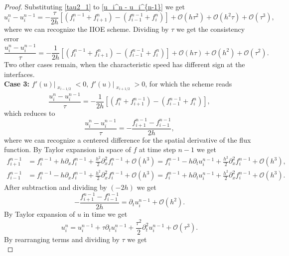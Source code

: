 \documentclass[../include.tex]{subfiles}
\begin{document}
\begin{proof}
Substituting \eqref{tau2_1} to \eqref{u_i^n - u_i^{n-1}} we get
\[	u_i^n - u_i^{n-1} = - \frac{\tau}{2h}\left[(f_i^{n-1} + f_{i+1}^{n}) - (f_{i-1}^{n-1} + f_i^{n})\right] + \mathcal{O}(h\tau^2) + \mathcal{O}(h^2\tau) + \mathcal{O}(\tau^3),\]
where we can recognize the IIOE scheme. Dividing by $ \tau $ we get the consistency error
\begin{equation}
	\frac{u_i^n - u_i^{n-1}}{\tau} = - \frac{1}{2h}\left[(f_i^{n-1} + f_{i+1}^{n}) - (f_{i-1}^{n-1} + f_i^{n})\right] + \mathcal{O}(h\tau) + \mathcal{O}(h^2) + \mathcal{O}(\tau^2).
\end{equation}
Two other cases remain, when the characteristic speed has different sign at the interfaces.\\
\textbf{Case 3: } $ f'(u)\big|_{\substack{x_{i-1/2}}} < 0,  \,f'(u)\big|_{\substack{x_{i+1/2}}} > 0 $, for which the scheme reads
\[
\frac{u_i^{n} - u_i^{n - 1}}{\tau} = - \frac{1}{2h}\left[(f_i^{n} + f_{i+1}^{n-1}) - (f_{i-1}^{n-1} + f_i^{n})\right],
\]
which reduces to
\begin{equation}
	\label{Taylor_exp}
	\frac{u_i^{n} - u_i^{n - 1}}{\tau} = - \frac{f_{i+1}^{n-1} - f_{i-1}^{n-1}}{2h},
\end{equation}
where we can recognize a centered difference for the spatial derivative of the flux function. By Taylor expansion in space of $ f $ at time step $ n-1 $ we get
\begin{align}
	f_{i+1}^{n-1} &= f_i^{n-1} + h \partial_x f_i^{n-1} + \frac{h^2}{2} \partial_x^2 f_i^{n-1} + \mathcal{O}(h^3) = 
	f_i^{n-1} - h \partial_t u_i^{n-1} + \frac{h^2}{2} \partial_x^2 f_i^{n-1} + \mathcal{O}(h^3),\nonumber\\
	f_{i-1}^{n-1} &= f_i^{n-1} - h\partial_x f_i^{n-1} + \frac{h^2}{2}\partial_x^2 f_i^{n-1} + \mathcal{O}(h^3) = f_i^{n-1} + h\partial_t u_i^{n-1} + \frac{h^2}{2}\partial_x^2 f_i^{n-1} + \mathcal{O}(h^3)\nonumber.
\end{align}
After subtraction and dividing by $ (-2h) $ we get
\begin{equation}
	\label{fderout}
	-\frac{f_{i+1}^{n-1} - f_{i-1}^{n-1}}{2h} = \partial_t u_i^{n-1} + \mathcal{O}(h^2).
\end{equation}
By Taylor expansion of $ u $ in time we get
\begin{equation}
	u_i^n = u_i^{n-1} + \tau \partial_t u_i^{n-1} + \frac{\tau^2}{2}\partial_t^2 u_i^{n-1} + \mathcal{O}(\tau^3).
\end{equation}
By rearranging terms and dividing by $ \tau $ we get
\begin{equation}

\end{equation}
\end{proof}
\end{document}
